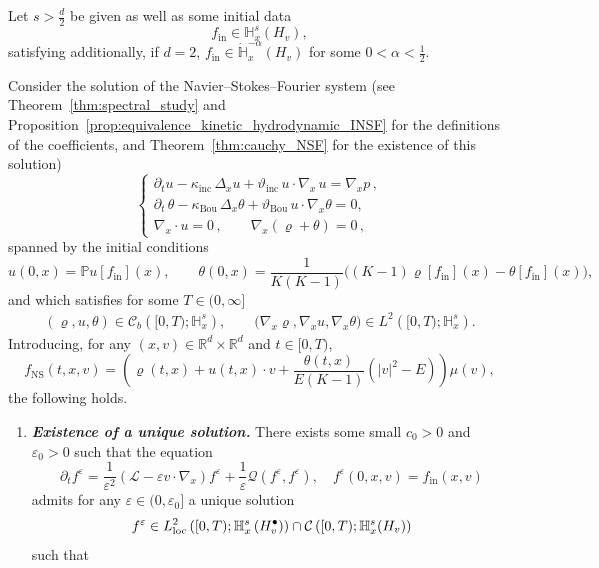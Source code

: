 \documentclass[AHL,Unicode,longabstracts,published]{cedram}
\newcommand{\ini}{\mathrm{in}}
\newcommand{\ns}{\mathrm{NS}}
\newcommand{\Inc}{\mathrm{inc}}
\newcommand{\Bou}{\mathrm{Bou}}
\newcommand{\R}{\mathbb{R}}
\newcommand{\bbH}{\mathbb{H}}
\newcommand{\bbP}{\mathbb{P}}
\newcommand{\CC}{\mathcal{C}}
\newcommand{\LL}{\mathcal{L}}
\newcommand{\QQ}{\mathcal{Q}}
\newcommand{\Ss}{H}
\newcommand{\Ssp}{H^{\bullet}}
\newcommand*\eps{{\varepsilon}}
\newcommand*{\relabel}{\renewcommand{\labelenumi}{(\theenumi)}}
\newcommand*{\bfenumi}{\renewcommand*{\theenumi}{\textit{\textbf{\arabic{enumi}}}}\relabel}
\begin{document}
\begin{theo}\label{thm:hydrodynamic_limit}
Let $s > \frac{d}{2}$ be given as well as some initial data
\[
f_\ini \in\bbH^s_x \left(\Ss_v \right),
\]
satisfying additionally, if $d=2$, $f_\ini \in \dot{\bbH}^{-\alpha}_x (\Ss_v)$ for some $0 < \alpha < \frac{1}{2}.$

Consider the solution of the Navier--Stokes--Fourier system (see Theorem~\ref{thm:spectral_study} and Proposition~\ref{prop:equivalence_kinetic_hydrodynamic_INSF} for the definitions of the coefficients, {and Theorem~\ref{thm:cauchy_NSF} for the existence of this solution})
\begin{equation}\label{eq:main-NSF}
\begin{cases}
\partial_{t}u-\kappa_{\Inc}\,\Delta_{x}u + \vartheta_{\Inc}\,u\cdot \nabla_{x}\,u= \nabla_{x}p\,,\\[6pt]
\partial_{t}\,\theta-\kappa_{\Bou}\,\Delta_{x}\theta +\vartheta_{\Bou}\,u\cdot \nabla_{x}\theta=0,\\[8pt]
\nabla_{x}\cdot u=0\,, \qquad \nabla_{x}\left(\varrho + \theta\right)= 0\,,
\end{cases}
\end{equation}
spanned by the initial conditions
\[
u(0, x) = \bbP u[f_\ini](x), \qquad \theta(0, x) = \frac{1}{K(K-1)}\big((K-1) \varrho[f_\ini](x) - \theta[f_\ini](x) \big),
\]
and which satisfies for some $T \in (0, \infty]$
\begin{gather*}
(\varrho, u, \theta) \in \CC_b\left([0, T) ;\bbH^s_x \right), \qquad \big(\nabla_x \varrho, \nabla_x u, \nabla_x \theta\big) \in L^2\left([0, T) ;\bbH^s_x \right).
\end{gather*}
Introducing, for any $(x,v) \in \R^{d}\times\R^{d}$ and $t \in [0,T)$,
\[
f_\ns(t, x, v) = \left(\varrho(t, x) + u(t, x) \cdot v + \frac{\theta(t, x)}{E(K-1)} \left(|v|^2 - E \right)\right) \mu(v),
\]
the following holds.
\begin{enumerate}\bfenumi
\item\label{theo1.12.1} \textit{\textbf{Existence of a unique solution.}} There exists some small $c_0 > 0$ and $\eps_0 > 0$ such that the equation
\[
\partial_t f^\eps = \frac{1}{\eps^2} \left(\LL - \eps v \cdot \nabla_x \right) f^\eps + \frac{1}{\eps} \QQ\left(f^\eps, f^\eps \right), \quad f^\eps(0, x, v) = f_\ini(x, v)
\]
admits for any $\eps \in (0, \eps_0]$ a unique solution
\[
f^\eps \in L^2_{\rm{loc}} \left([0, T) ; \bbH^s_x \left(\Ssp_v\right) \right) \cap \CC\left([0,T);\bbH^s_x(\Ss_v)\right)
\]
such that

\end{enumerate}
\end{theo}
\end{document}
